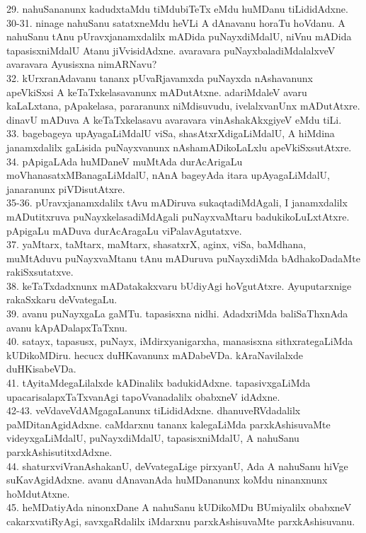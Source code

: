 \documentclass{article}
\begin{document}
29. nahuSananunx kadudxtaMdu tiMdubiTeTx eMdu huMDanu tiLididAdxne.\\
30-31. ninage nahuSanu satatxneMdu heVLi A dAnavanu horaTu hoVdanu. A nahuSanu tAnu pUravxjanamxdalilx mADida puNayxdiMdalU, niVnu mADida tapasisxniMdalU Atanu jiVvisidAdxne. avaravara puNayxbaladiMdalalxveV avaravara Ayusisxna nimARNavu?\\
32. kUrxranAdavanu tananx pUvaRjavamxda puNayxda nAshavanunx apeVkiSxsi A keTaTxkelasavanunx mADutAtxne. adariMdaleV avaru kaLaLxtana, pApakelasa, pararanunx niMdisuvudu, ivelalxvanUnx mADutAtxre. dinavU mADuva A keTaTxkelasavu avaravara vinAshakAkxgiyeV eMdu tiLi.\\
33. bagebageya upAyagaLiMdalU viSa, shasAtxrXdigaLiMdalU, A hiMdina janamxdalilx gaLisida puNayxvanunx nAshamADikoLaLxlu apeVkiSxsutAtxre.\\
34. pApigaLAda huMDaneV muMtAda durAcArigaLu moVhanasatxMBanagaLiMdalU, nAnA bageyAda itara upAyagaLiMdalU, janaranunx piVDisutAtxre.\\
35-36. pUravxjanamxdalilx tAvu mADiruva sukaqtadiMdAgali, I janamxdalilx mADutitxruva puNayxkelasadiMdAgali puNayxvaMtaru badukikoLuLxtAtxre. pApigaLu mADuva durAcAragaLu viPalavAgutatxve.\\
37. yaMtarx, taMtarx, maMtarx, shasatxrX, aginx, viSa, baMdhana, muMtAduvu puNayxvaMtanu tAnu mADuruva puNayxdiMda bAdhakoDadaMte rakiSxsutatxve.\\
38. keTaTxdadxnunx mADatakakxvaru bUdiyAgi hoVgutAtxre. Ayuputarxnige rakaSxkaru deVvategaLu.\\
39. avanu puNayxgaLa gaMTu. tapasisxna nidhi. AdadxriMda baliSaThxnAda avanu kApADalapxTaTxnu.\\
40. satayx, tapasusx, puNayx, iMdirxyanigarxha, manasisxna sithxrategaLiMda kUDikoMDiru. hecucx duHKavanunx mADabeVDa. kAraNavilalxde duHKisabeVDa.\\
41. tAyitaMdegaLilalxde kADinalilx badukidAdxne. tapasivxgaLiMda upacarisalapxTaTxvanAgi tapoVvanadalilx obabxneV idAdxne.\\
42-43. veVdaveVdAMgagaLanunx tiLididAdxne. dhanuveRVdadalilx paMDitanAgidAdxne. caMdarxnu tananx kalegaLiMda parxkAshisuvaMte videyxgaLiMdalU, puNayxdiMdalU, tapasisxniMdalU, A nahuSanu parxkAshisutitxdAdxne.\\
44. shaturxviVranAshakanU, deVvategaLige pirxyanU, Ada A nahuSanu hiVge suKavAgidAdxne. avanu dAnavanAda huMDananunx koMdu ninanxnunx hoMdutAtxne.\\
45. heMDatiyAda ninonxDane A nahuSanu kUDikoMDu BUmiyalilx obabxneV cakarxvatiRyAgi, savxgaRdalilx iMdarxnu parxkAshisuvaMte parxkAshisuvanu.\\
\end{document}
